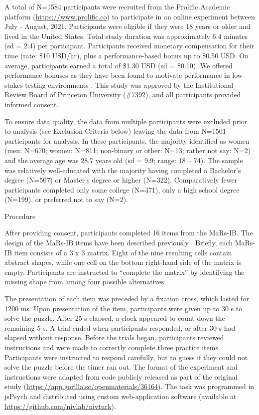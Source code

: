 \documentclass[a4paper,man,natbib]{apa6}
\makeatletter
\renewcommand{\subsubsection}{\@startsection{subsubsection}{3}
  {\z@}%
  {\b@level@two@skip}{\e@level@two@skip}%
  {\normalfont\normalsize\bfseries}}
\makeatother
\begin{document}
A total of N=1584 participants were recruited from the Prolific Academic platform (\url{https://www.prolific.co}) to participate in an online experiment between July - August, 2021. Participants were eligible if they were 18 years or older and lived in the United States. Total study duration was approximately 6.4 minutes (sd = 2.4) per participant. Participants received monetary compensation for their time (rate: \$10 USD/hr), plus a performance-based bonus up to \$0.50 USD. On average, participants earned a total of \$1.30 USD (sd = \$0.10). We offered performance bonuses as they have been found to motivate performance in low-stakes testing environments \citep{duckworth2011role, gignac2018moderate}. This study was approved by the Institutional Review Board of Princeton University (\#7392), and all participants provided informed consent.

To ensure data quality, the data from multiple participants were excluded prior to analysis (see Exclusion Criteria below) leaving the data from N=1501 participants for analysis. In these participants, the majority identified as women (men: N=670; women: N=811; non-binary or other: N=13; rather not say: N=2) and the average age was 28.7 years old (sd = 9.9; range: 18 -- 74). The sample was relatively well-educated with the majority having completed a Bachelor's degree (N=507) or Master's degree or higher (N=322). Comparatively fewer participants completed only some college (N=471), only a high school degree (N=199), or preferred not to say (N=2). 

\subsubsection{Procedure}

After providing consent, participants completed 16 items from the MaRs-IB. The design of the MaRs-IB items have been described previously \citep{chierchia2019matrix}. Briefly, each MaRs-IB item consists of a 3 x 3 matrix. Eight of the nine resulting cells contain abstract shapes, while one cell on the bottom right-hand side of the matrix is empty. Participants are instructed to ``complete the matrix'' by identifying the missing shape from among four possible alternatives. 

The presentation of each item was preceded by a fixation cross, which lasted for 1200 ms. Upon presentation of the item, participants were given up to 30 s to solve the puzzle. After 25 s elapsed, a clock appeared to count down the remaining 5 s. A trial ended when participants responded, or after 30 s had elapsed without response. Before the trials began, participants reviewed instructions and were made to correctly complete three practice items. Participants were instructed to respond carefully, but to guess if they could not solve the puzzle before the timer ran out. The format of the experiment and instructions were adapted from code publicly released as part of the original study (\url{https://app.gorilla.sc/openmaterials/36164}). The task was programmed in jsPsych \citep{de2015jspsych} and distributed using custom web-application software (available at \url{https://github.com/nivlab/nivturk}). 
\end{document}
